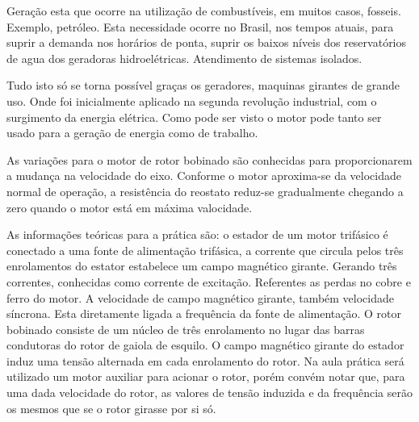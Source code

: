 \documentclass[paper=a4, fontsize=11pt]{article}
\begin{document}
Geração esta que ocorre na utilização de combustíveis, 
em muitos casos, fosseis. Exemplo, petróleo. Esta 
necessidade ocorre no Brasil, nos tempos atuais, para
suprir a demanda nos horários de ponta, suprir
os baixos níveis dos reservatórios de agua dos 
geradoras hidroelétricas. Atendimento de sistemas
isolados. 

Tudo isto só se torna possível graças os geradores, 
maquinas girantes de grande uso. Onde foi inicialmente 
aplicado na segunda revolução industrial, com o surgimento
da energia elétrica. Como pode ser visto o motor
pode tanto ser usado para a geração de energia como de 
trabalho.

As variações para o motor de rotor bobinado são conhecidas
para proporcionarem a mudança na velocidade do eixo. Conforme
o motor aproxima-se da velocidade normal de operação, a 
resistência do reostato reduz-se gradualmente chegando a 
zero quando o motor está em máxima valocidade.

As informações teóricas para a prática são: o estador 
de um motor trifásico é conectado a uma fonte de alimentação
trifásica, a corrente que circula pelos três enrolamentos 
do estator estabelece um campo magnético girante. Gerando
três correntes, conhecidas como corrente de excitação. 
Referentes as perdas no cobre e ferro do motor. A velocidade
de campo magnético girante, também velocidade síncrona. Esta
diretamente ligada a frequência da fonte de alimentação. 
O rotor bobinado consiste de um núcleo de três enrolamento no
lugar das barras condutoras do rotor de gaiola de esquilo. O
campo magnético girante do estador induz uma tensão alternada
em cada enrolamento do rotor. Na aula prática será utilizado
um motor auxiliar para acionar o rotor, porém convém notar que, 
para uma dada velocidade do rotor, as valores de tensão 
induzida e da frequência serão os mesmos que se o rotor 
girasse por si só.
\end{document}
